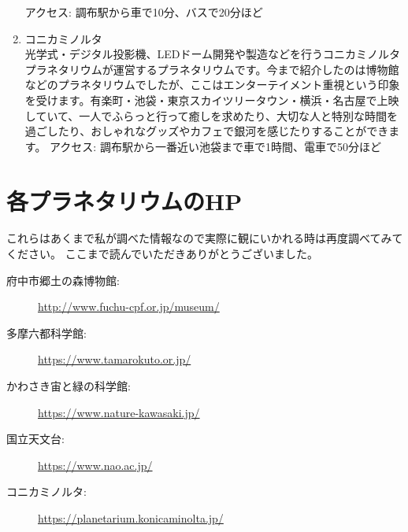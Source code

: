 \documentclass[../../super_nova_2023]{subfiles}
\begin{document}
\begin{enumerate}
	      \vspace{-\zw}アクセス: 調布駅から車で10分、バスで20分ほど
	      \vspace{\zw}
	\item {}
	      コニカミノルタ\mbox{}\\光学式・デジタル投影機、LEDドーム開発や製造などを行うコニカミノルタプラネタリウムが運営するプラネタリウムです。今まで紹介したのは博物館などのプラネタリウムでしたが、ここはエンターテイメント重視という印象を受けます。有楽町・池袋・東京スカイツリータウン・横浜・名古屋で上映していて、一人でふらっと行って癒しを求めたり、大切な人と特別な時間を過ごしたり、おしゃれなグッズやカフェで銀河を感じたりすることができます。
	      \vspace{-\zw}アクセス: 調布駅から一番近い池袋まで車で1時間、電車で50分ほど
\end{enumerate}

{}
\section*{各プラネタリウムのHP}
これらはあくまで私が調べた情報なので実際に観にいかれる時は再度調べてみてください。
ここまで読んでいただきありがとうございました。

\begin{description}
	\item[府中市郷土の森博物館: ] \url{http://www.fuchu-cpf.or.jp/museum/}
	\item[多摩六都科学館: ] \url{https://www.tamarokuto.or.jp/}
	\item[かわさき宙と緑の科学館: ] \url{ https://www.nature-kawasaki.jp/}
	\item[国立天文台: ] \url{https://www.nao.ac.jp/}
	\item[コニカミノルタ: ] \url{https://planetarium.konicaminolta.jp/}
\end{description}
\end{document}
